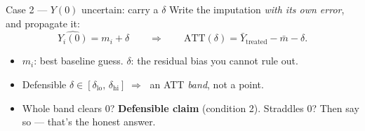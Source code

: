 \documentclass[xcolor=dvipsnames]{beamer}
\newcommand\makebiggaps{\addtolength{\itemsep}{.5\baselineskip}}
\newcommand\YY{Y(0)}                    %
\newcommand\ATT{\text{ATT}}
\begin{document}
\begin{frame}{Case 2 --- $\YY$ uncertain: carry a $\delta$}
\small
Write the imputation \emph{with its own error}, and propagate it:
\[ \widehat{Y_i(0)} = m_i + \delta
   \qquad\Longrightarrow\qquad
   \ATT(\delta) = \bar Y_{\text{treated}} - \bar m - \delta . \]
\begin{itemize}\makebiggaps
\item $m_i$: best baseline guess. $\delta$: the residual bias you cannot rule out.
\item Defensible $\delta \in [\delta_{\text{lo}},\,\delta_{\text{hi}}]
      \;\Rightarrow\;$ an ATT \emph{band}, not a point.
\item Whole band clears $0$? \textbf{Defensible claim} (condition 2).
      Straddles $0$? Then say so --- that's the honest answer.
\end{itemize}
\end{frame}
\end{document}
